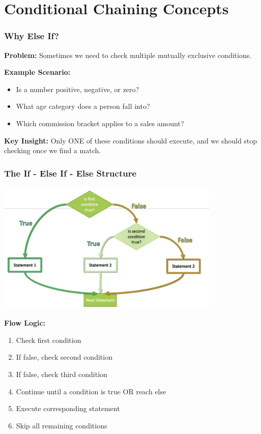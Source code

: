 \documentclass{beamer}
\begin{document}
\section{Conditional Chaining Concepts}

\begin{frame}
\frametitle{Why Else If?}
\textbf{Problem:} Sometimes we need to check multiple mutually exclusive conditions.\pause

\vspace{0.3cm}
\textbf{Example Scenario:}
\begin{itemize}
    \item Is a number positive, negative, or zero?
    \item What age category does a person fall into?
    \item Which commission bracket applies to a sales amount?
\end{itemize}\pause

\vspace{0.3cm}
\textbf{Key Insight:} Only ONE of these conditions should execute, and we should stop checking once we find a match.
\end{frame}

\begin{frame}
\frametitle{The If - Else If - Else Structure}

\begin{center}
\includegraphics[width=0.8\textwidth]{../images/06_else-if-flowchart.jpg}
\end{center}

\vspace{0.3cm}
\textbf{Flow Logic:}
\begin{enumerate}
    \item Check first condition
    \item If false, check second condition
    \item If false, check third condition
    \item Continue until a condition is true OR reach else
    \item Execute corresponding statement
    \item Skip all remaining conditions
\end{enumerate}
\end{frame}
\end{document}
